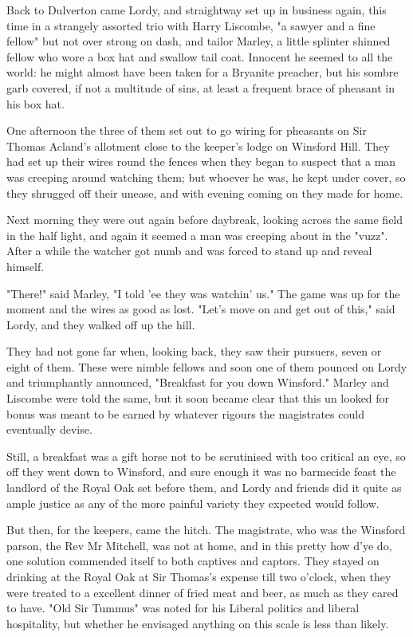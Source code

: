 Back to Dulverton came Lordy, and straightway set up in business again, this time in a strangely assorted trio with Harry Liscombe, "a sawyer and a fine fellow" but not over strong on dash, and tailor Marley, a little splinter shinned fellow who wore a box hat and swallow tail coat. Innocent he seemed to all the world: he might almost have been taken for a Bryanite preacher, but his sombre garb covered, if not a multitude of sins, at least a frequent brace of pheasant in his box hat.

One afternoon the three of them set out to go wiring for pheasants on Sir Thomas Acland's allotment close to the keeper's lodge on Winsford Hill. They had set up their wires round the fences when they began to suspect that a man was creeping around watching them; but whoever he was, he kept under cover, so they shrugged off their unease, and with evening coming on they made for home.

Next morning they were out again before daybreak, looking across the same field in the half light, and again it seemed a man was creeping about in the "vuzz". After a while the watcher got numb and was forced to stand up and reveal himself.

"There!" said Marley, "I told 'ee they was watchin' us."
 The game was up   for the moment   and the wires as good as lost. "Let's move on and get out of this," said Lordy, and they walked off up the hill.
 
They had not gone far when, looking back, they saw their pursuers, seven or eight of them. These were nimble fellows and soon one of them pounced on Lordy and triumphantly announced, "Breakfast for you down Winsford." Marley and Liscombe were told the same, but it soon became clear that this un looked for bonus was meant to be earned by whatever rigours the magistrates could eventually devise.

Still, a breakfast was a gift horse not to be scrutinised with too critical an eye, so off they went down to Winsford, and sure enough it was no barmecide feast the landlord of the Royal Oak set before them, and Lordy and friends did it quite as ample justice as any of the more painful variety they expected would follow.

But then, for the keepers, came the hitch. The magistrate, who was the Winsford parson, the Rev Mr Mitchell, was not at home, and in this pretty how d'ye do, one solution commended itself to both captives and captors. They stayed on drinking at the Royal Oak at Sir Thomas's expense till two o'clock, when they were treated to a excellent dinner of fried meat and beer, as much as they cared to have.   "Old Sir Tummus" was noted for his Liberal politics and liberal hospitality, but whether he envisaged anything on this scale is less than likely.

